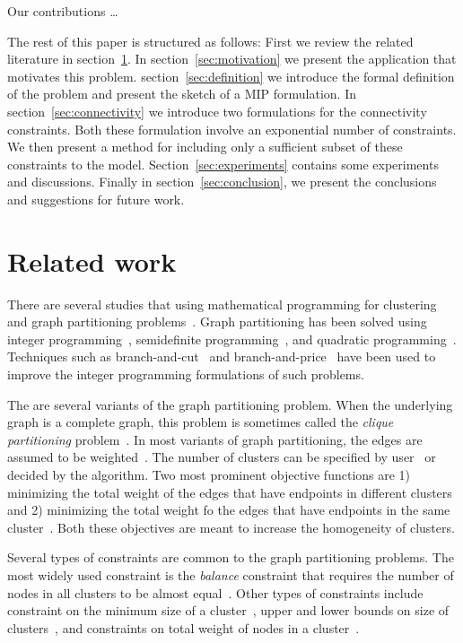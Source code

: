 \documentclass[conference,compsoc]{IEEEtran}
\begin{document}
Our contributions \ldots

The rest of this paper is structured as follows: First we review the related literature in section~\ref{sec:related}. In
section~\ref{sec:motivation} we present the application that motivates
this problem.  section~\ref{sec:definition} we introduce the formal
definition of the problem and present the sketch of a MIP formulation.
In section~\ref{sec:connectivity} we introduce two formulations for
the connectivity constraints. Both these formulation involve an
exponential number of constraints. We then present a method for
including only a sufficient subset of these constraints to the
model. Section~\ref{sec:experiments} contains some experiments and
discussions. Finally in section~\ref{sec:conclusion}, 
we present the conclusions and suggestions for future work.

\section{Related work}
\label{sec:related}
There are several studies that using mathematical programming
for clustering and graph partitioning
problems~\cite{Hansen}. Graph partitioning has been solved using integer programming~\cite{REF}, semidefinite programming~\cite{REF}, and quadratic programming~\cite{REF}. Techniques such as branch-and-cut~\cite{REF} and branch-and-price~\cite{REF} have been used to improve the integer programming formulations of such problems. 

The are several variants of the graph partitioning problem. When the underlying graph is a complete graph, this problem is sometimes called the \emph{clique partitioning} problem~\cite{REF}. In most variants of graph partitioning, the edges are assumed to be weighted~\cite{REF}. The number of clusters can be specified by user~\cite{REF} or decided by the algorithm. Two most prominent objective functions are 1) minimizing the total weight of the edges that have endpoints in different clusters~\cite{REF} and 2) minimizing the total weight fo the edges that have endpoints in the same cluster~\cite{REF}. Both these objectives are meant to increase the homogeneity of clusters.  

Several types of constraints are common to the graph partitioning problems. The most widely used constraint is the \emph{balance} constraint that requires the number of nodes in all clusters to be almost equal~\cite{REF}. Other types of constraints include constraint on the minimum size of a cluster~\cite{REF}, upper and lower bounds on size of clusters~\cite{REF}, and constraints on total weight of nodes in a cluster~\cite{REF}. 
\end{document}

